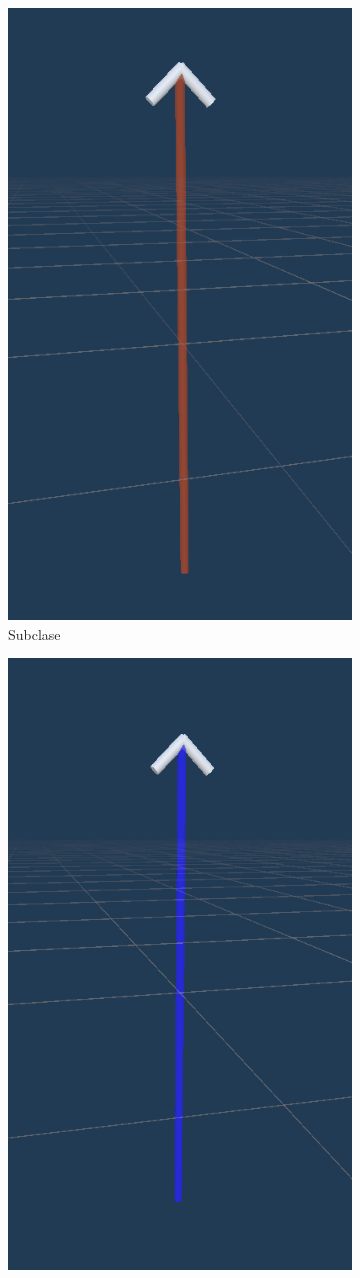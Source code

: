 \begin{figure}[ht]
   \centering
   \begin{subfigure}{0.3\textwidth}
       \centering
       \includegraphics[height=\textwidth]{chapter2/figures/subclass.png}
       \caption{Subclase}
   \end{subfigure}
   \hfill
   \begin{subfigure}{0.3\textwidth}
       \centering
       \includegraphics[height=\textwidth]{chapter2/figures/hasconnection.png}

\end{subfigure}
\end{figure}
